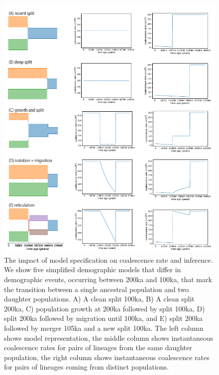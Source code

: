 \documentclass[]{article}
\begin{document}
\begin{figure}

    \includegraphics{figures/toy_models/toy_model_combo}


    \caption{The impact of model specification on coalescence rate and inference.
    We show five simplified demographic models that differ in demographic events, 
    occurring between 200ka and 100ka, that mark the transition between a single 
    ancestral population and two daughter populations. A) A clean split 100ka, 
B) A clean split 200ka, C) population growth at 200ka followed by split 100ka, 
D) split 200ka followed by migration until 100ka, and E) split 200ka followed by 
merger 105ka and a new split 100ka. The left column shows model representation, 
the middle column shows instantaneous coalescence rates for pairs of lineages from the
same daughter population, the right column shows instantaneous coalescence rates for
pairs of lineages coming from distinct populations.  
        \label{fig:toymodels}
    }

    \end{figure}
    
    
\end{document}
